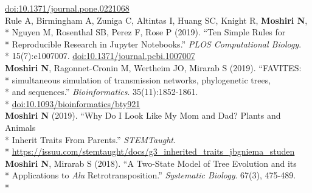 \documentclass[margin,line]{res}
\begin{document}
\begin{resume}
\hspace*{8mm} \href{https://doi.org/10.1371/journal.pone.0221068}{doi:10.1371/journal.pone.0221068}\\
\hspace*{4mm} Rule A, Birmingham A, Zuniga C, Altintas I, Huang SC, Knight R, \textbf{Moshiri N},\\*
\hspace*{9mm} Nguyen M, Rosenthal SB, Perez F, Rose P (2019). ``Ten Simple Rules for\\*
\hspace*{9mm} Reproducible Research in Jupyter Notebooks.'' \textit{PLOS Computational Biology}.\\*\vspace{2mm}
\hspace*{8mm} 15(7):e1007007. \href{https://doi.org/10.1371/journal.pcbi.1007007}{doi:10.1371/journal.pcbi.1007007}\\
\hspace*{4mm} \textbf{Moshiri N}, Ragonnet-Cronin M, Wertheim JO, Mirarab S (2019). ``FAVITES:\\*
\hspace*{9mm} simultaneous simulation of transmission networks, phylogenetic trees,\\*
\hspace*{9mm} and sequences.'' \textit{Bioinformatics}. 35(11):1852-1861.\\*\vspace{2mm}
\hspace*{8mm} \href{https://doi.org/10.1093/bioinformatics/bty921}{doi:10.1093/bioinformatics/bty921}\\
\hspace*{4mm} \textbf{Moshiri N} (2019). ``Why Do I Look Like My Mom and Dad? Plants and Animals\\*
\hspace*{9mm} Inherit Traits From Parents.'' \textit{STEMTaught}.\\*\vspace{2mm}
\hspace*{8mm} \href{https://issuu.com/stemtaught/docs/g3_inherited_traits_jbgniema_studen}{https://issuu.com/stemtaught/docs/g3\_inherited\_traits\_jbgniema\_studen}\\
\hspace*{4mm} \textbf{Moshiri N}, Mirarab S (2018). ``A Two-State Model of Tree Evolution and its\\*
\hspace*{9mm} Applications to \textit{Alu} Retrotransposition.'' \textit{Systematic Biology}. 67(3), 475-489.\\*\vspace{2mm}

\end{resume}
\end{document}
